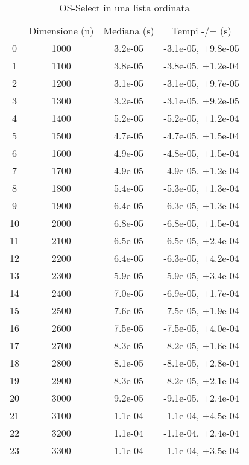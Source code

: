 \begin{table}
\centering
\caption{OS-Select in una lista ordinata}
\label{OS-Select in una lista ordinata}
\begin{adjustbox}{width=1\textwidth/2}
\begin{tabular}{|c|c|c|c|}
\hline
 & Dimensione (n) & Mediana (s) & Tempi -/+ (s) \\
0 & 1000 & 3.2e-05 & -3.1e-05, +9.8e-05 \\
\cline{1-4}
1 & 1100 & 3.8e-05 & -3.8e-05, +1.2e-04 \\
\cline{1-4}
2 & 1200 & 3.1e-05 & -3.1e-05, +9.7e-05 \\
\cline{1-4}
3 & 1300 & 3.2e-05 & -3.1e-05, +9.2e-05 \\
\cline{1-4}
4 & 1400 & 5.2e-05 & -5.2e-05, +1.2e-04 \\
\cline{1-4}
5 & 1500 & 4.7e-05 & -4.7e-05, +1.5e-04 \\
\cline{1-4}
6 & 1600 & 4.9e-05 & -4.8e-05, +1.5e-04 \\
\cline{1-4}
7 & 1700 & 4.9e-05 & -4.9e-05, +1.2e-04 \\
\cline{1-4}
8 & 1800 & 5.4e-05 & -5.3e-05, +1.3e-04 \\
\cline{1-4}
9 & 1900 & 6.4e-05 & -6.3e-05, +1.3e-04 \\
\cline{1-4}
10 & 2000 & 6.8e-05 & -6.8e-05, +1.5e-04 \\
\cline{1-4}
11 & 2100 & 6.5e-05 & -6.5e-05, +2.4e-04 \\
\cline{1-4}
12 & 2200 & 6.4e-05 & -6.3e-05, +4.2e-04 \\
\cline{1-4}
13 & 2300 & 5.9e-05 & -5.9e-05, +3.4e-04 \\
\cline{1-4}
14 & 2400 & 7.0e-05 & -6.9e-05, +1.7e-04 \\
\cline{1-4}
15 & 2500 & 7.6e-05 & -7.5e-05, +1.9e-04 \\
\cline{1-4}
16 & 2600 & 7.5e-05 & -7.5e-05, +4.0e-04 \\
\cline{1-4}
17 & 2700 & 8.3e-05 & -8.2e-05, +1.6e-04 \\
\cline{1-4}
18 & 2800 & 8.1e-05 & -8.1e-05, +2.8e-04 \\
\cline{1-4}
19 & 2900 & 8.3e-05 & -8.2e-05, +2.1e-04 \\
\cline{1-4}
20 & 3000 & 9.2e-05 & -9.1e-05, +2.4e-04 \\
\cline{1-4}
21 & 3100 & 1.1e-04 & -1.1e-04, +4.5e-04 \\
\cline{1-4}
22 & 3200 & 1.1e-04 & -1.1e-04, +2.4e-04 \\
\cline{1-4}
23 & 3300 & 1.1e-04 & -1.1e-04, +3.5e-04 \\

\end{tabular}
\end{adjustbox}
\end{table}
